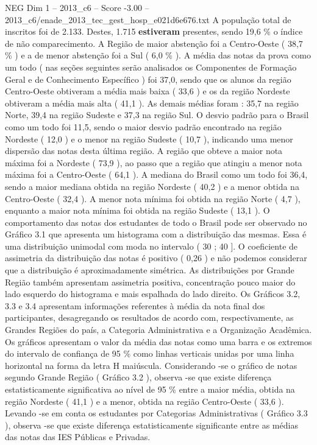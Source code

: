 \begin{textsample}{NEG Dim 1 – 2013\_c6 – Score -3.00 – 2013\_c6/enade\_2013\_tec\_gest\_hosp\_e021d6e676.txt}
A população total de inscritos foi de 2.133.
Destes, 1.715 \textbf{estiveram} presentes, sendo 19,6 \% o índice de não comparecimento.
A Região de maior abstenção foi a Centro-Oeste ( 38,7 \% ) e a de menor abstenção foi a Sul ( 6,0 \% ).
A média das notas da prova como um todo ( nas seções seguintes serão analisados os Componentes de Formação Geral e de Conhecimento Específico ) foi 37,0, sendo que os alunos da região Centro-Oeste obtiveram a média mais baixa ( 33,6 ) e os da região Nordeste obtiveram a média mais alta ( 41,1 ).
As demais médias foram : 35,7 na região Norte, 39,4 na região Sudeste e 37,3 na região Sul.
O desvio padrão para o Brasil como um todo foi 11,5, sendo o maior desvio padrão encontrado na região Nordeste ( 12,0 ) e o menor na região Sudeste ( 10,7 ), indicando uma menor dispersão das notas desta última região.
A região que obteve a maior nota máxima foi a Nordeste ( 73,9 ), ao passo que a região que atingiu a menor nota máxima foi a Centro-Oeste ( 64,1 ).
A mediana do Brasil como um todo foi 36,4, sendo a maior mediana obtida na região Nordeste ( 40,2 ) e a menor obtida na Centro-Oeste ( 32,4 ).
A menor nota mínima foi obtida na região Norte ( 4,7 ), enquanto a maior nota mínima foi obtida na região Sudeste ( 13,1 ).
O comportamento das notas dos estudantes de todo o Brasil pode ser observado no Gráfico 3.1 que apresenta um histograma com a distribuição das mesmas.
Essa é uma distribuição unimodal com moda no intervalo ( 30 ; 40 ].
O coeficiente de assimetria da distribuição das notas é positivo ( 0,26 ) e não podemos considerar que a distribuição é aproximadamente simétrica.
As distribuições por Grande Região também apresentam assimetria positiva, concentração pouco maior do lado esquerdo do histograma e mais espalhada do lado direito.
Os Gráficos 3.2, 3.3 e 3.4 apresentam informações referentes à média da nota final dos participantes, desagregando os resultados de acordo com, respectivamente, as Grandes Regiões do país, a Categoria Administrativa e a Organização Acadêmica.
Os gráficos apresentam o valor da média das notas como uma barra e os extremos do intervalo de confiança de 95 \% como linhas verticais unidas por uma linha horizontal na forma da letra H maiúscula.
Considerando -se o gráfico de notas segundo Grande Região ( Gráfico 3.2 ), observa -se que existe diferença estatisticamente significativa ao nível de 95 \% entre a maior média, obtida na região Nordeste ( 41,1 ) e a menor, obtida na região Centro-Oeste ( 33,6 ).
Levando -se em conta os estudantes por Categorias Administrativas ( Gráfico 3.3 ), observa -se que existe diferença estatisticamente significante entre as médias das notas das IES Públicas e Privadas.

\end{textsample}
